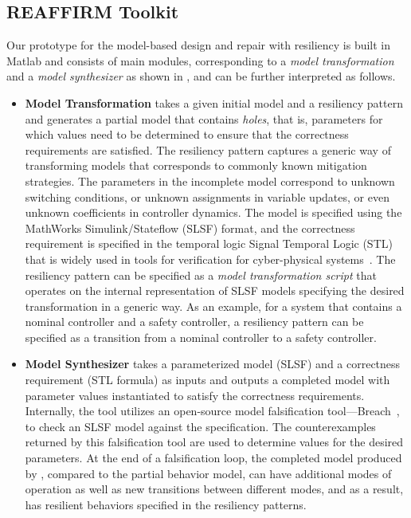 \subsection{REAFFIRM Toolkit}
%
Our \toolreaffirm prototype for the model-based design and repair with resiliency is built in Matlab and consists of main modules, corresponding to a \emph{model transformation} and a \emph{model synthesizer} as shown in , and can be further interpreted as follows.
%
\begin{itemize}[leftmargin= 2 em]
    \item \textbf{Model Transformation} takes a given initial model and a resiliency pattern and generates a partial model that contains \emph{holes}, that is, parameters for which values need to be determined to ensure that the correctness requirements are satisfied. The resiliency pattern captures a generic way of transforming models that corresponds to commonly known mitigation strategies. The parameters in the incomplete model correspond to unknown switching conditions, or unknown assignments in variable updates, or even unknown coefficients in controller dynamics. The model is specified using the MathWorks Simulink/Stateflow (SLSF) format, and the correctness requirement is specified in the temporal logic Signal Temporal Logic (STL) that is widely used in tools for verification for cyber-physical systems~\cite{maler2004monitoring}. The resiliency pattern can be specified as a \emph{model transformation script} that operates on the internal representation of SLSF models specifying the desired transformation in a generic way. As an example, for a system that contains a nominal controller and a safety controller, a resiliency pattern can be specified as a transition from a nominal controller to a safety controller.
%
\item \textbf{Model Synthesizer} takes a parameterized model (SLSF) and a correctness requirement (STL formula) as inputs and outputs a completed model with parameter values instantiated to satisfy the correctness requirements.  Internally, the tool utilizes an open-source model falsification tool---Breach~\cite{donze2010breach}, to check an SLSF model against the specification. The counterexamples returned by this falsification tool are used to determine values for the desired parameters. At the end of a falsification loop, the completed model produced by \toolreaffirm, compared to the partial behavior model, can have additional modes of operation as well as new transitions between different modes, and as a result, has resilient behaviors specified in the resiliency patterns.
\end{itemize}
